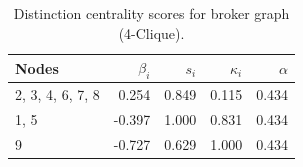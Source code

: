 \begin{table}
\centering
\caption{\label{tab:b4}Distinction centrality scores for broker graph (4-Clique).}
\centering
\begin{tabular}[t]{lrrrr}
\toprule
Nodes & $\beta_i$ & $s_i$ & $\kappa_i$ & $\alpha$\\
\midrule
2, 3, 4, 6, 7, 8 & 0.254 & 0.849 & 0.115 & 0.434\\
1, 5 & -0.397 & 1.000 & 0.831 & 0.434\\
9 & -0.727 & 0.629 & 1.000 & 0.434\\
\bottomrule
\end{tabular}
\end{table}
